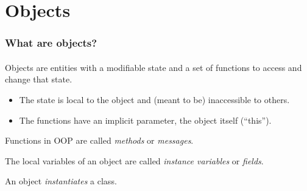 \documentclass{beamer}
\begin{document}

\section{Objects}
\begin{frame}[fragile]
\frametitle{What are objects? }
\framesubtitle{}
Objects  are entities with a modifiable state and a set of functions to access
and change that state.
\begin{itemize}
\item The state is local to the object and (meant to be) inaccessible to 
others.
\item The functions have an implicit parameter, the object itself (``this'').
\end{itemize}

Functions in OOP are called \textit{methods} or \textit{messages}.
\bigskip

The local variables of an object are called \textit{instance variables}
or \textit{fields}.
\bigskip

An object \textit{instantiates} a class.
\end{frame}
\end{document}
